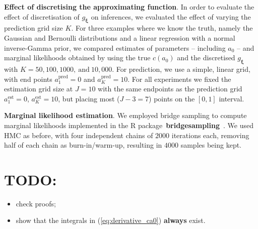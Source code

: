 \documentclass[a4paper, notitlepage, 11pt]{article}
\begin{document}
\textbf{Effect of discretising the approximating function}.
In order to evaluate the effect of discretisation of $g_{\boldsymbol\xi}$ on inferences, we evaluated the effect of varying the prediction grid size $K$.
For three examples where we know the truth, namely the Gaussian and Bernoulli distributions and a linear regression with a normal inverse-Gamma prior, we compared estimates of parameters -- including $a_0$ -- and marginal likelihoods obtained by using the true $c(a_0)$ and the discretised $g_{\boldsymbol\xi}$ with $K =  50, 100, 1000,~\text{and}\: 10, 000$.
For prediction, we use a simple, linear grid, with end points $a^{\text{pred}}_1 = 0$ and $a^{\text{pred}}_K = 10$.
For all experiments we fixed the estimation grid size at $J = 10$ with the same endpoints as the prediction grid $a^{\text{est}}_1 = 0$, $a^{\text{est}}_K = 10$, but placing most ($J-3 = 7$) points on the $[0, 1]$ interval.

\textbf{Marginal likelihood estimation}.
We employed  bridge sampling to compute marginal likelihoods implemented in the R package~\textbf{bridgesampling}~\citep{Gronau2017}.
We used HMC as before, with four independent chains of $2000$ iterations each, removing half of each chain as burn-in/warm-up, resulting in $4000$ samples being kept.


%  

\section*{TODO:}
\begin{itemize}
 \item check proofs;
 \item show that the integrals in (\ref{eq:derivative_ca0}) \textbf{always} exist.
\end{itemize}
\end{document}
